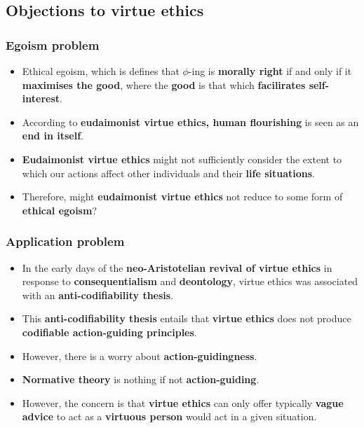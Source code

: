 \documentclass[11pt]{article}
\begin{document}
\subsection{Objections to virtue ethics}
\label{sec:org09440f5}

\subsubsection{Egoism problem}
\label{sec:orgf0ff031}
\begin{itemize}
\item Ethical egoism, which is defines that \(\phi\)-ing is \textbf{morally right} if and only if it \textbf{maximises the good}, where the \textbf{good} is that which \textbf{facilirates self-interest}.
\item According to \textbf{eudaimonist virtue ethics, human flourishing} is seen as an \textbf{end in itself}.
\item \textbf{Eudaimonist virtue ethics} might not sufficiently consider the extent to which our actions affect other individuals and their \textbf{life situations}.
\item Therefore, might \textbf{eudaimonist virtue ethics} not reduce to some form of \textbf{ethical egoism}?
\end{itemize}
\subsubsection{Application problem}
\label{sec:orgde448d6}
\begin{itemize}
\item In the early days of the \textbf{neo-Aristotelian revival of virtue ethics} in response to \textbf{consequentialism} and \textbf{deontology}, virtue ethics was associated with an \textbf{anti-codifiability thesis}.
\item This \textbf{anti-codifiability thesis} entails that \textbf{virtue ethics} does not produce \textbf{codifiable action-guiding principles}.
\item However, there is a worry about \textbf{action-guidingness}.
\item \textbf{Normative theory} is nothing if not \textbf{action-guiding}.
\item However, the concern is that \textbf{virtue ethics} can only offer typically \textbf{vague advice} to act as a \textbf{virtuous person} would act in a given situation.
\end{itemize}

 \newpage
\end{document}
